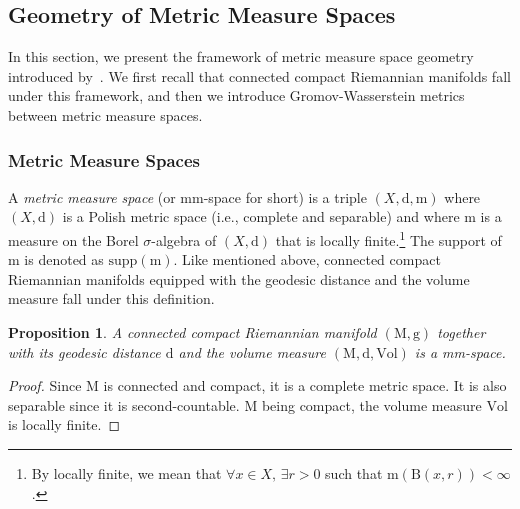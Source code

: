 \documentclass[pdflatex,sn-mathphys-ay]{sn-jnl}%
\newtheorem{proposition}{Proposition}[section]
\newcommand{\spa}{X}
\newcommand{\man}{\mathrm{M}}
\newcommand{\mes}{\mathrm{m}}
\newcommand{\dis}{\mathrm{d}}
\newcommand{\supp}{\mathrm{supp}}
\newcommand{\ball}{{\mathrm {B}}}
\newcommand{\vol}{\mathrm{Vol}}
\newcommand{\g}{\mathrm{g}}
\newcommand{\change}[1]{\noindent #1}
\theoremstyle{thmstyleone}%
\begin{document}
\subsection{Geometry of Metric Measure Spaces}
In this section, we present the framework of metric measure space geometry introduced by~\citet{sturm2006geometry}. We first recall that 
connected compact Riemannian manifolds fall under this framework, and then we introduce Gromov-Wasserstein metrics between metric measure spaces.

\subsubsection{Metric Measure Spaces}

A {\it metric measure space} (or mm-space for short) is a triple $(\spa,\dis,\mes)$ where $(\spa,\dis)$ is a Polish metric space (i.e., complete and separable)
and where $\mes$ is a measure on the Borel $\sigma$-algebra of $(\spa,\dis)$ 
    that is locally finite.\footnote{By locally finite, we mean that $\forall x\in \spa,\,\exists r>0$ such that $\mes(\ball(x,r))<\infty$.}
The support of $\mes$
is denoted as $\supp(\mes)$. \change{Like mentioned above, connected compact Riemannian manifolds equipped with the geodesic distance and the volume measure fall under this definition.}

\begin{proposition}
    A connected compact Riemannian manifold $(\man,\g)$ together with its geodesic distance $\dis$ and the volume measure $(\man,\dis,\vol)$ is a mm-space. 
\end{proposition}

\begin{proof}
Since $\man$ is connected and compact, %
it is a complete metric space. It is also separable since %
it is second-countable. $\man$ being compact, the volume measure
$\vol$ is locally finite.
\end{proof}
\end{document}
